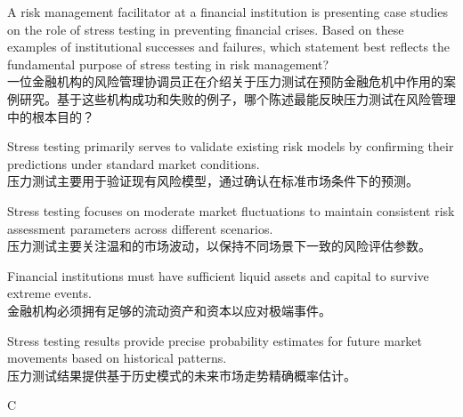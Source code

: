 \documentclass{article}
\newcounter{question} %
\begin{document}
\begin{question}
    A risk management facilitator at a financial institution is presenting case studies on the role of stress testing in preventing financial crises. Based on these examples of institutional successes and failures, which statement best reflects the fundamental purpose of stress testing in risk management?\\
    一位金融机构的风险管理协调员正在介绍关于压力测试在预防金融危机中作用的案例研究。基于这些机构成功和失败的例子，哪个陈述最能反映压力测试在风险管理中的根本目的？\\
\end{question}
\begin{choices}
    \item Stress testing primarily serves to validate existing risk models by confirming their predictions under standard market conditions.\\
    压力测试主要用于验证现有风险模型，通过确认在标准市场条件下的预测。
    \item Stress testing focuses on moderate market fluctuations to maintain consistent risk assessment parameters across different scenarios.\\
    压力测试主要关注温和的市场波动，以保持不同场景下一致的风险评估参数。
    \item Financial institutions must have sufficient liquid assets and capital to survive extreme events.\\
    金融机构必须拥有足够的流动资产和资本以应对极端事件。
    \item Stress testing results provide precise probability estimates for future market movements based on historical patterns.\\
    压力测试结果提供基于历史模式的未来市场走势精确概率估计。
\end{choices}

\begin{correctanswer}
    C
\end{correctanswer}
\end{document}
